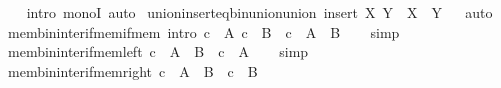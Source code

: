 \begin{isabellebody}
%
\isadelimproof
\ \ %
\endisadelimproof
%
\isatagproof
{}\isamarkupfalse%
\ {\isacharparenleft}{\kern0pt}intro\ monoI{\isacharparenright}{\kern0pt}\ auto%
\endisatagproof
{\isafoldproof}%
%
\isadelimproof
\isanewline
%
\endisadelimproof
\isanewline
{}\isamarkupfalse%
\ union{\isacharunderscore}{\kern0pt}insert{\isacharunderscore}{\kern0pt}eq{\isacharunderscore}{\kern0pt}bin{\isacharunderscore}{\kern0pt}union{\isacharunderscore}{\kern0pt}union{\isacharcolon}{\kern0pt}\ {\isachardoublequoteopen}{\isasymUnion}{\isacharparenleft}{\kern0pt}insert\ X\ Y{\isacharparenright}{\kern0pt}\ {\isacharequal}{\kern0pt}\ X\ {\isasymunion}\ {\isasymUnion}Y{\isachardoublequoteclose}%
\isadelimproof
\ %
\endisadelimproof
%
\isatagproof
{}\isamarkupfalse%
\ auto%
\endisatagproof
{\isafoldproof}%
%
\isadelimproof
%
\endisadelimproof
%
\isadelimdocument
%
\endisadelimdocument
%
\isatagdocument
%
\isamarkuptrue%
%
\endisatagdocument
{\isafolddocument}%
%
\isadelimdocument
%
\endisadelimdocument
{}\isamarkupfalse%
\ mem{\isacharunderscore}{\kern0pt}bin{\isacharunderscore}{\kern0pt}inter{\isacharunderscore}{\kern0pt}if{\isacharunderscore}{\kern0pt}mem{\isacharunderscore}{\kern0pt}if{\isacharunderscore}{\kern0pt}mem\ {\isacharbrackleft}{\kern0pt}intro{\isacharbang}{\kern0pt}{\isacharbrackright}{\kern0pt}{\isacharcolon}{\kern0pt}\ {\isachardoublequoteopen}{\isasymlbrakk}c\ {\isasymin}\ A{\isacharsemicolon}{\kern0pt}\ c\ {\isasymin}\ B{\isasymrbrakk}\ {\isasymLongrightarrow}\ c\ {\isasymin}\ A\ {\isasyminter}\ B{\isachardoublequoteclose}\isanewline
%
\isadelimproof
\ \ %
\endisadelimproof
%
\isatagproof
{}\isamarkupfalse%
\ simp%
\endisatagproof
{\isafoldproof}%
%
\isadelimproof
\isanewline
%
\endisadelimproof
\isanewline
{}\isamarkupfalse%
\ mem{\isacharunderscore}{\kern0pt}bin{\isacharunderscore}{\kern0pt}inter{\isacharunderscore}{\kern0pt}if{\isacharunderscore}{\kern0pt}mem{\isacharunderscore}{\kern0pt}left{\isacharcolon}{\kern0pt}\ {\isachardoublequoteopen}c\ {\isasymin}\ A\ {\isasyminter}\ B\ {\isasymLongrightarrow}\ c\ {\isasymin}\ A{\isachardoublequoteclose}\isanewline
%
\isadelimproof
\ \ %
\endisadelimproof
%
\isatagproof
{}\isamarkupfalse%
\ simp%
\endisatagproof
{\isafoldproof}%
%
\isadelimproof
\isanewline
%
\endisadelimproof
\isanewline
{}\isamarkupfalse%
\ mem{\isacharunderscore}{\kern0pt}bin{\isacharunderscore}{\kern0pt}inter{\isacharunderscore}{\kern0pt}if{\isacharunderscore}{\kern0pt}mem{\isacharunderscore}{\kern0pt}right{\isacharcolon}{\kern0pt}\ {\isachardoublequoteopen}c\ {\isasymin}\ A\ {\isasyminter}\ B\ {\isasymLongrightarrow}\ c\ {\isasymin}\ B{\isachardoublequoteclose}\isanewline

\end{isabellebody}

